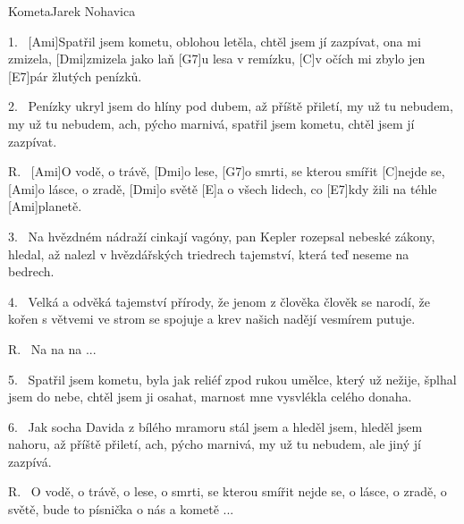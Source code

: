 \begin{song}{Kometa}{Jarek Nohavica}

\begin{xverse}{1.~}
[\large Ami]Spatřil jsem kometu, oblohou letěla,
chtěl jsem jí zazpívat, ona mi zmizela,
[\large Dmi]zmizela jako laň [\large G7]u lesa v remízku,
[\large C]v očích mi zbylo jen [\large E7]pár žlutých penízků.
\end{xverse}

\begin{xverse}{2.~}
Penízky ukryl jsem do hlíny pod dubem,
až příště přiletí, my už tu nebudem,
my už tu nebudem, ach, pýcho marnivá,
spatřil jsem kometu, chtěl jsem jí zazpívat.
\end{xverse}

\begin{xverse}{R.~}
[\large Ami]O vodě, o trávě, [\large Dmi]o lese,
[\large G7]o smrti, se kterou smířit [\large C]nejde se,
[\large Ami]o lásce, o zradě, [\large Dmi]o světě
[\large E]a o všech lidech, co [\large E7]kdy žili na téhle [\large Ami]planetě.
\end{xverse}

\begin{xverse}{3.~}
Na hvězdném nádraží cinkají vagóny,
pan Kepler rozepsal nebeské zákony,
hledal, až nalezl v hvězdářských triedrech
tajemství, která teď neseme na bedrech.
\end{xverse}

\begin{xverse}{4.~}
Velká a odvěká tajemství přírody,
že jenom z člověka člověk se narodí,
že kořen s větvemi ve strom se spojuje
a krev našich nadějí vesmírem putuje.
\end{xverse}

\begin{xverse}{R.~}
Na na na ...
\end{xverse}


\begin{xverse}{5.~}
Spatřil jsem kometu, byla jak reliéf
zpod rukou umělce, který už nežije,
šplhal jsem do nebe, chtěl jsem ji osahat,
marnost mne vysvlékla celého donaha.
\end{xverse}


\begin{xverse}{6.~}
Jak socha Davida z bílého mramoru
stál jsem a hleděl jsem, hleděl jsem nahoru,
až příště přiletí, ach, pýcho marnivá,
my už tu nebudem, ale jiný jí zazpívá.
\end{xverse}

\begin{xverse}{R.~}
O vodě, o trávě, o lese,
o smrti, se kterou smířit nejde se,
o lásce, o zradě, o světě,
bude to písnička o nás a kometě ...
\end{xverse}

\end{song}

